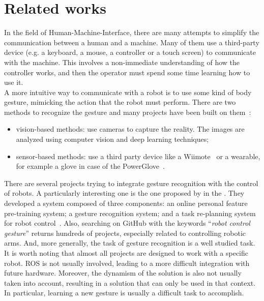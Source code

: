 \documentclass[../thesis.tex]{subfiles}
\begin{document}
\section{Related works}
In the field of Human-Machine-Interface, there are many attempts to simplify the communication between a human and a machine. Many of them use a third-party device (e.g. a keyboard, a mouse, a controller or a touch screen) to communicate with the machine. This involves a non-immediate understanding of how the controller works, and then the operator must spend some time learning how to use it.\\

A more intuitive way to communicate with a robot is to use some kind of body gesture, mimicking the action that the robot must perform. There are two methods to recognize the gesture and many projects have been built on them~\cite{paper:design_and_evaluate_hand_gesture}:
\begin{itemize}
    \item vision-based methods: use cameras to capture the reality. The images are analyzed using computer vision and deep learning techniques;
    \item sensor-based methods: use a third party device like a Wiimote~\cite{paper:guo2008exploring} or a wearable, for example a glove in case of the PowerGlove~\cite{paper:kessler1995evaluation}.
\end{itemize}

There are several projects trying to integrate gesture recognition with the control of robots. A particularly interesting one is the one proposed by \citeauthor{paper:chen2019online} in the \citeyear{paper:chen2019online}.  They developed a system composed of three components: an online personal feature pre-training system; a gesture recognition system; and a task re-planning system for robot control~\cite{paper:chen2019online}. Also, searching on GitHub with the keywords ``\textit{robot control gesture}'' returns hundreds of projects, especially related to controlling robotic arms. And, more generally, the task of gesture recognition is a well studied task.\\

It is worth noting that almost all projects are designed to work with a specific robot. \gls{ROS} is not usually involved, leading to a more difficult integration with future hardware. Moreover, the dynamism of the solution is also not usually taken into account, resulting in a solution that can only be used in that context. In particular, learning a new gesture is usually a difficult task to accomplish.
\end{document}
